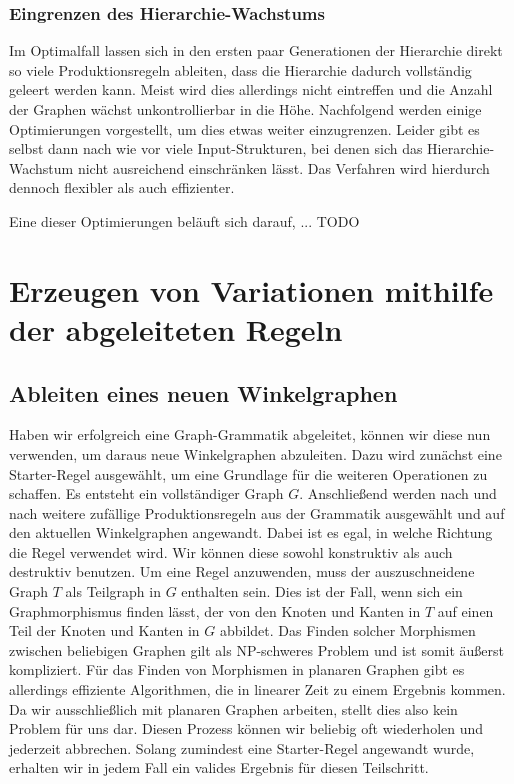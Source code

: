 \subsubsection{Eingrenzen des Hierarchie-Wachstums}
Im Optimalfall lassen sich in den ersten paar Generationen der Hierarchie direkt so viele Produktionsregeln ableiten, dass die Hierarchie dadurch vollständig
geleert werden kann. Meist wird dies allerdings nicht eintreffen und die Anzahl der Graphen wächst unkontrollierbar in die Höhe. Nachfolgend werden einige
Optimierungen vorgestellt, um dies etwas weiter einzugrenzen. Leider gibt es selbst dann nach wie vor viele Input-Strukturen, bei denen sich das
Hierarchie-Wachstum nicht ausreichend einschränken lässt. Das Verfahren wird hierdurch dennoch flexibler als auch effizienter.

Eine dieser Optimierungen beläuft sich darauf, ... TODO



\section{Erzeugen von Variationen mithilfe der abgeleiteten Regeln}
\subsection{Ableiten eines neuen Winkelgraphen}
Haben wir erfolgreich eine Graph-Grammatik abgeleitet, können wir diese nun verwenden, um daraus neue Winkelgraphen abzuleiten. Dazu wird zunächst eine
Starter-Regel ausgewählt, um eine Grundlage für die weiteren Operationen zu schaffen. Es entsteht ein vollständiger Graph \(G\). Anschließend werden nach
und nach weitere zufällige Produktionsregeln aus der Grammatik ausgewählt und auf den aktuellen Winkelgraphen angewandt. Dabei ist es egal, in welche
Richtung die Regel verwendet wird. Wir können diese sowohl konstruktiv als auch destruktiv benutzen. Um eine Regel anzuwenden, muss der
auszuschneidene Graph \(T\) als Teilgraph in \(G\) enthalten sein. Dies ist der Fall, wenn sich ein Graphmorphismus finden lässt, der von den Knoten und Kanten
in \(T\) auf einen Teil der Knoten und Kanten in \(G\) abbildet. Das Finden solcher Morphismen zwischen beliebigen Graphen gilt als NP-schweres Problem und
ist somit äußerst kompliziert. \cite{34_cook} Für das Finden von Morphismen in planaren Graphen gibt es allerdings effiziente Algorithmen, die in linearer
Zeit zu einem Ergebnis kommen. \cite{8_eppstein} Da wir ausschließlich mit planaren Graphen arbeiten, stellt dies also kein Problem für uns dar. Diesen
Prozess können wir beliebig oft wiederholen und jederzeit abbrechen. Solang zumindest eine Starter-Regel angewandt wurde, erhalten wir in jedem Fall ein
valides Ergebnis für diesen Teilschritt.

